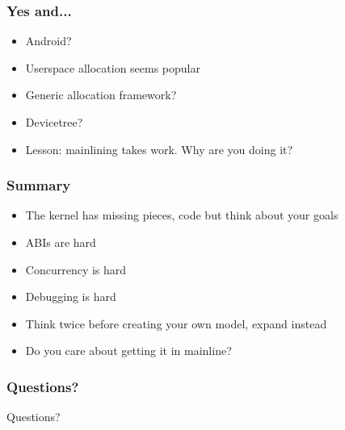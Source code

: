 \documentclass{beamer}
\begin{document}
\begin{frame}
\frametitle{Yes and...}
\begin{itemize}
\item Android?
\item Userspace allocation seems popular
\item Generic allocation framework?
\item Devicetree?
\item Lesson: mainlining takes work. Why are you doing it?
\end{itemize}
\end{frame}

\begin{frame}
\frametitle{Summary}
\begin{itemize}
\item The kernel has missing pieces, code but think about your goals
\item ABIs are hard
\item Concurrency is hard
\item Debugging is hard
\item Think twice before creating your own model, expand instead
\item Do you care about getting it in mainline?
\end{itemize}
\end{frame}

\begin{frame}
\frametitle{Questions?}
\Huge{\centerline{Questions?}}
\end{frame}
\end{document}
